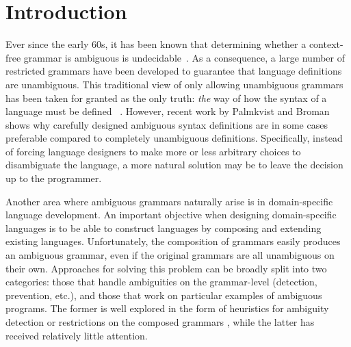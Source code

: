 \documentclass[runningheads]{llncs}
\begin{document}
\section{Introduction}

Ever since the early 60s, it has been known that determining whether a context-free
grammar is ambiguous is undecidable~\cite{cantorAmbiguityProblemBackus1962}. As a consequence,
a large number of restricted grammars have been developed to guarantee
that language definitions are unambiguous. This traditional view of
only allowing unambiguous grammars has been taken for granted as the
only truth: \emph{the} way of how the syntax of a language must be
defined ~\cite{sudkampLanguagesMachinesIntroduction1997,ahoCompilersPrinciplesTechniques2006,webberModernProgrammingLanguages2003,cooperEngineeringCompiler2011,ginsburgAmbiguityContextFree1966}.
%
However, recent work by
Palmkvist and Broman~\cite{palmkvistCreatingDomainSpecificLanguages2019} shows why
carefully designed ambiguous syntax definitions are in some cases
preferable compared to completely unambiguous
definitions. Specifically, instead of forcing language designers to
make more or less arbitrary choices to disambiguate the language, a more natural
solution may be to leave the decision up to the programmer.



Another area where ambiguous grammars naturally arise is
in domain-specific language development.  An important
objective when designing domain-specific languages is to be able to construct
languages by composing and extending existing
languages.
Unfortunately, the composition of
%
grammars easily produces
an ambiguous grammar, even if the original grammars are all
unambiguous on their own. Approaches for solving this problem can be broadly split
into two categories: those that handle ambiguities on the
grammar-level (detection, prevention, etc.), and those that work on
particular examples of ambiguous programs. The former is well explored
in the form of heuristics for ambiguity detection
\cite{bastenAmbiguityDetectionProgramming2011,axelssonAnalyzingContextFreeGrammars2008,brabrandAnalyzingAmbiguityContextFree2007}
or restrictions on the composed grammars
\cite{kaminskiModularWellDefinednessAnalysis2013}, while the
latter has received relatively little attention.
\end{document}
